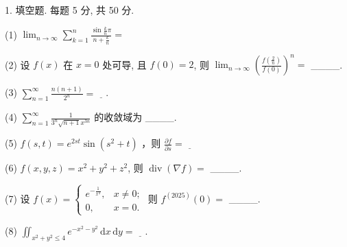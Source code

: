 \documentclass{examcollection}
\begin{document}
{\begin{minipage}{\textwidth}
1. 填空题. 每题 5 分, 共 50 分.\par
(1) $\lim_{n\to \infty}\sum_{k = 1}^{n}\frac{\sin\frac{k}{n}\pi}{n + \frac{k}{n}} =$\par
(2) 设 $f(x)$ 在 $x = 0$ 处可导, 且 $f(0) = 2$, 则 $\lim_{n \to \infty} \left( \frac{f\left(\frac{2}{n}\right)}{f(0)} \right)^n =$ \_\_\_\_.\par
(3) $\sum_{n=1}^{\infty} \frac{n(n+1)}{2^n} = \underline{\quad}$.\par
(4) $\sum_{n=1}^{\infty} \frac{1}{3^n \sqrt{n+1} x^{3n}}$ 的收敛域为 \_\_\_\_.\par
(5) $f(s,t) = e^{2st}\sin (s^2 +t)$ ，则 $\frac{\partial f}{\partial s} = \underline{\quad}$\par
(6) $f(x,y,z) = x^{2} + y^{2} + z^{2}$, 则 $\operatorname{div}(\nabla f) =$ \_\_\_\_.\par
(7) 设  $f(x)=\left\{\begin{aligned}e^{-\frac{1}{x^{2}}}, & x\neq0;\\ 0, & x=0.\end{aligned}\right.$  则  $f^{(2025)}(0)=$  \_\_\_\_.\par
(8) $\iint_{x^2 + y^2 \leq 4} e^{-x^2 - y^2} \, \mathrm{d}x \, \mathrm{d}y = \underline{\quad}$.\par
\end{minipage}}
\ifdim\dimexpr\ht\proofbox+\dp\proofbox\relax>\textheight
\noindent\resizebox{!}{\textheight}{\usebox{\proofbox}}\else\noindent\usebox{\proofbox}\fi\clearpage
\end{document}
